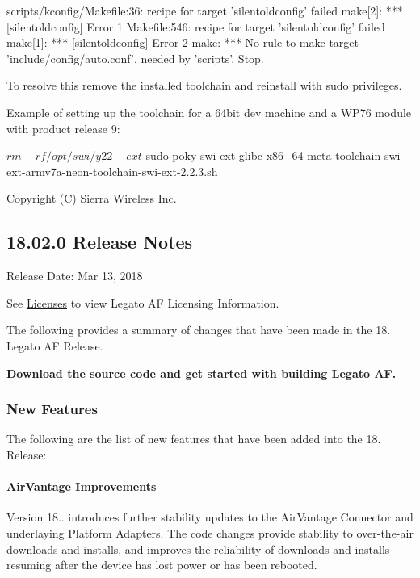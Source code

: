 \begin{DoxyVerb}scripts/kconfig/Makefile:36: recipe for target 'silentoldconfig' failed
make[2]: *** [silentoldconfig] Error 1
Makefile:546: recipe for target 'silentoldconfig' failed
make[1]: *** [silentoldconfig] Error 2
make: *** No rule to make target 'include/config/auto.conf', needed by 'scripts'.  Stop.
\end{DoxyVerb}


To resolve this remove the installed toolchain and reinstall with {\ttfamily sudo} privileges.

Example of setting up the toolchain for a 64bit dev machine and a W\+P76 module with product release 9\+: \begin{DoxyVerb}$ rm -rf /opt/swi/y22-ext
$ sudo poky-swi-ext-glibc-x86_64-meta-toolchain-swi-ext-armv7a-neon-toolchain-swi-ext-2.2.3.sh
\end{DoxyVerb}


Copyright (C) Sierra Wireless Inc. \hypertarget{releaseNotes18020}{}\subsection{18.02.0 Release Notes}\label{releaseNotes18020}
Release Date\+: Mar 13, 2018

See \hyperlink{aboutLicenses}{Licenses} to view Legato AF Licensing Information.

The following provides a summary of changes that have been made in the 18. Legato AF Release.

{\bfseries  Download the \hyperlink{aboutReleaseInfo}{source code} and get started with \hyperlink{basicBuild}{building Legato AF}. }\hypertarget{releaseNotes18020_rn1802_Features}{}\subsubsection{New Features}\label{releaseNotes18020_rn1802_Features}
The following are the list of new features that have been added into the 18. Release\+:\hypertarget{releaseNotes18020_rn1802_Features_AV}{}\paragraph{Air\+Vantage Improvements}\label{releaseNotes18020_rn1802_Features_AV}
Version 18.. introduces further stability updates to the Air\+Vantage Connector and underlaying Platform Adapters. The code changes provide stability to over-\/the-\/air downloads and installs, and improves the reliability of downloads and installs resuming after the device has lost power or has been rebooted.

